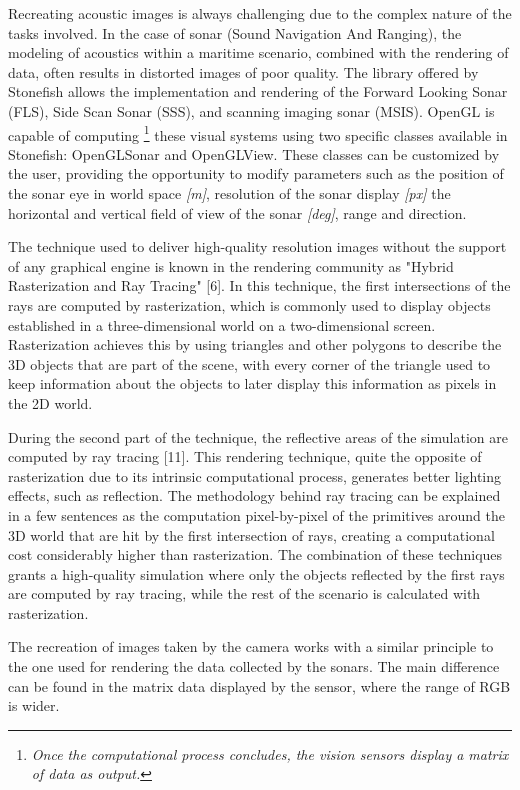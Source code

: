 \documentclass[]{article}
\begin{document}
		Recreating acoustic images is always challenging due to the complex nature of the tasks involved. In the case of sonar (Sound Navigation And Ranging), the modeling of acoustics within a maritime scenario, combined with the rendering of data, often results in distorted images of poor quality. The library offered by Stonefish allows the implementation and rendering of the Forward Looking Sonar (FLS), Side Scan Sonar (SSS), and scanning imaging sonar (MSIS). OpenGL is capable of computing \footnote[5]{\textit{Once the computational process concludes, the vision sensors display a matrix of data as output.}} these visual systems using two specific classes available in Stonefish: OpenGLSonar and OpenGLView. These classes can be customized by the user, providing the opportunity to modify parameters such as the position of the sonar eye in world space \textit{[m]}, resolution of the sonar display \textit{[px]} the horizontal and vertical field of view of the sonar \textit{[deg]}, range and direction. 
		
		The technique used to deliver high-quality resolution images without the support of any graphical engine is known in the rendering community as "Hybrid Rasterization and Ray Tracing" [6]. In this technique, the first intersections of the rays are computed by rasterization, which is commonly used to display objects established in a three-dimensional world on a two-dimensional screen. Rasterization achieves this by using triangles and other polygons to describe the 3D objects that are part of the scene, with every corner of the triangle used to keep information about the objects to later display this information as pixels in the 2D world.
		
		During the second part of the technique, the reflective areas of the simulation are computed by ray tracing [11]. This rendering technique, quite the opposite of rasterization due to its intrinsic computational process, generates better lighting effects, such as reflection. The methodology behind ray tracing can be explained in a few sentences as the computation pixel-by-pixel of the primitives around the 3D world that are hit by the first intersection of rays, creating a computational cost considerably higher than rasterization. The combination of these techniques grants a high-quality simulation where only the objects reflected by the first rays are computed by ray tracing, while the rest of the scenario is calculated with rasterization.
		
		\newpage
		
		The recreation of images taken by the camera works with a similar principle to the one used for rendering the data collected by the sonars. The main difference can be found in the matrix data displayed by the sensor, where the range of RGB is wider.
	
\end{document}
